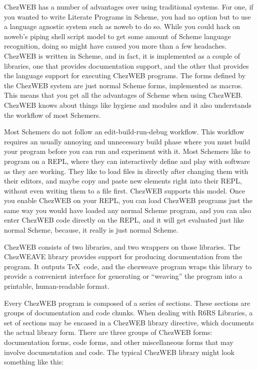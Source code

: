 ChezWEB has a number of advantages over using traditional systems.
For one, if you wanted to write Literate Programs in Scheme, you had
no option but to use a language agnostic system such as noweb to do
so.  While you could hack on noweb's piping shell script model to get
some amount of Scheme language recognition, doing so might have caused
you more than a few headaches.  ChezWEB is written in Scheme, and in
fact, it is implemented as a couple of libraries, one that provides
documentation support, and the other that provides the language
support for executing ChezWEB programs.  The forms defined by the
ChezWEB system are just normal Scheme forms, implemented as macros.
This means that you get all the advantages of Scheme when using
ChezWEB.  ChezWEB knows about things like hygiene and modules and it
also understands the workflow of most Schemers.

Most Schemers do not follow an edit-build-run-debug workflow.  This
workflow requires an usually annoying and unnecessary build phase
where you must build your program before you can run and experiment
with it.  Most Schemers like to program on a REPL, where they can
interactively define and play with software as they are working.  They
like to load files in directly after changing them with their editors,
and maybe copy and paste new elements right into their REPL, without
even writing them to a file first.  ChezWEB supports this model.  Once
you enable ChezWEB on your REPL, you can load ChezWEB programs just
the same way you would have loaded any normal Scheme program, and you
can also enter ChezWEB code directly on the REPL, and it will get
evaluated just like normal Scheme, because, it really is just normal
Scheme.

ChezWEB consists of two libraries, and two wrappers on those
libraries.  The ChezWEAVE library provides support for producing
documentation from the program.  It outputs \TeX\ code, and the
chezweave program wraps this library to provide a convenient interface
for generating or ``weaving'' the program into a printable,
human-readable format.

%
Every ChezWEB program is composed of a series of sections.  These
sections are groups of documentation and code chunks.  When dealing
with R6RS Libraries, a set of sections may be encased in a ChezWEB
library directive, which documents the actual library form.  There are
three groups of ChezWEB forms: documentation forms, code forms, and
other miscellaneous forms that may involve documentation and code.
The typical ChezWEB library might look something like this:

